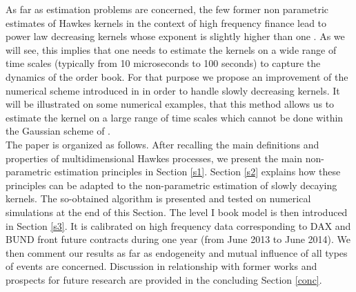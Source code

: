 \documentclass[a4paper,11pt]{article}
\begin{document}
\noindent As far as estimation problems are concerned, the few former non parametric estimates of Hawkes kernels in the context of high frequency finance lead to power law decreasing kernels whose exponent is slightly higher than one \cite{bacry2012non,bacry2014hawkes,hardiman2013critical}. As we will see, this implies that one needs to estimate the kernels on a wide range of time scales (typically from 10 microseconds to 100 seconds) to capture the dynamics of the order book. For that purpose we propose an improvement of the numerical scheme introduced in \cite{bacry2014hawkes,bacry2014second} in order to handle slowly decreasing kernels. It will be illustrated on some numerical examples, that this method allows us to estimate the kernel on a large range of time scales which cannot be done within the Gaussian scheme of \cite{bacry2014second}.\\




\noindent The paper is organized as follows. After recalling the main definitions and properties of multidimensional Hawkes processes, we present the main non-parametric estimation principles in Section \ref{s1}. Section \ref{s2} explains how these principles can be adapted to the non-parametric estimation of slowly decaying kernels. The so-obtained algorithm is presented and tested on numerical simulations at the end of this Section. The level I book model is then introduced in Section \ref{s3}. It is calibrated on high frequency data corresponding to DAX and BUND front future contracts during one year (from June 2013 to June 2014). We then comment our results as far as endogeneity and mutual influence of all types of events are concerned. Discussion in relationship with former works and prospects for future research are provided in the concluding Section \ref{conc}.
\end{document}
